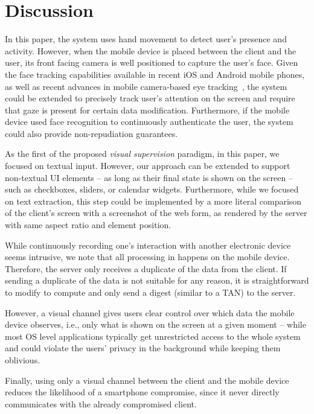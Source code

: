 
\section{Discussion} 
\label{integriscreen:sec:discussion}


In this paper, the system uses hand movement to detect user's presence and activity.
However, when the mobile device is placed between the client and the user, its front facing camera is well positioned to capture the user's face.
Given the face tracking capabilities available in recent iOS and Android mobile phones, as well as recent advances in mobile camera-based eye tracking~\cite{krafka2016eye}, the system could be extended to precisely track user's attention on the screen and require that gaze is present for certain data modification.
Furthermore, if the mobile device used face recognition to continuously authenticate the user, the system could also provide non-repudiation guarantees.


As the first of the proposed \textit{visual supervision} paradigm, in this paper, we focused on textual input.
However, our approach can be extended to support non-textual UI elements -- as long as their final state is shown on the screen -- such as checkboxes, sliders, or calendar widgets.
Furthermore, while we focused on text extraction, this step could be implemented by a more literal comparison of the client's screen with a screenshot of the web form, as rendered by the server with same aspect ratio and element position.

While continuously recording one's interaction with another electronic device seems intrusive, we note that all processing in \sysname happens on the mobile device.
Therefore, the server only receives a duplicate of the data from the client.
If sending a duplicate of the data is not suitable for any reason, it is straightforward to modify \name to compute and only send a digest (similar to a TAN) to the server.

However, a visual channel gives users clear control over which data the mobile device observes, i.e., only what is shown on the screen at a given moment -- while most OS level applications typically get unrestricted access to the whole system and could violate the users' privacy in the background while keeping them oblivious.

Finally, using only a visual channel between the client and the mobile device reduces the likelihood of a smartphone compromise, since it never directly communicates with the already compromised client.